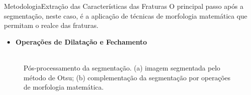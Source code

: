 \documentclass{beamer}
\begin{document}
\begin{frame}{Metodologia}{Extração das Características das Fraturas}
    O principal passo após a segmentação, neste caso, é a aplicação de técnicas de morfologia matemática que permitam o realce das fraturas.
    \begin{itemize}
        \item \textbf{Operações de Dilatação e Fechamento}
    \end{itemize}
    
    \begin{figure}[!htb]
        \centering
         \hspace*{0.2cm}
        \\
        \scriptsize{Pós-processamento da segmentação. (a) imagem segmentada pelo método de Otsu; (b) complementação da segmentação por operações de morfologia matemática.}
    \end{figure}
\end{frame}
\end{document}
